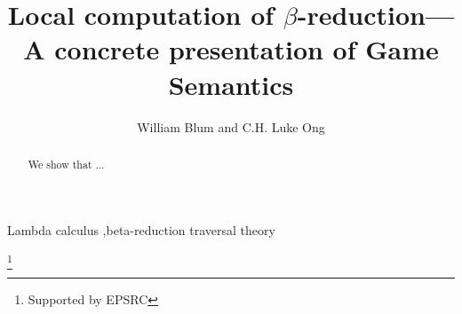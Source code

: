 \documentclass[amsthm]{elsart}
\begin{document}
\begin{keyword}
Lambda calculus \sep beta-reduction
traversal theory
\end{keyword}
\begin{frontmatter}
\title{Local computation of $\beta$-reduction---A concrete presentation of Game Semantics}
\author{William Blum and C.H. Luke Ong}
\address{Oxford University Computing Laboratory}
\thanks[EPSRC]{Supported by EPSRC}
\begin{abstract}
We show that ...
\end{abstract}
\end{frontmatter}

\maketitle \tableofcontents \bigskip

\listoftodos
\bigskip





\end{document}
